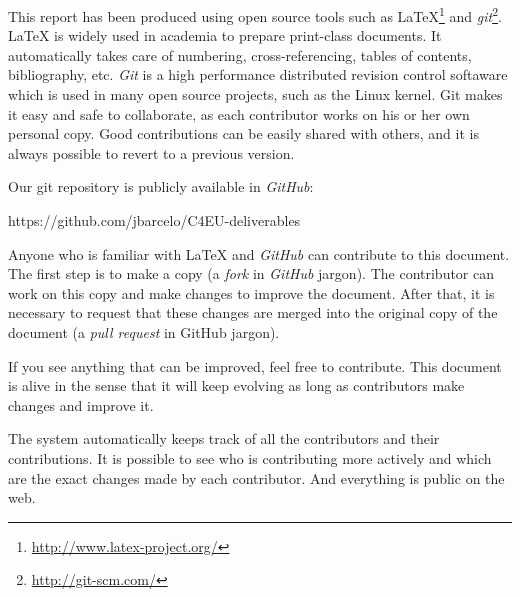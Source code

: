 This report has been produced using open source tools such as {\LaTeX}\footnote{\url{http://www.latex-project.org/}} and \emph{git}\footnote{\url{http://git-scm.com/}}.
{\LaTeX} is widely used in academia to prepare print-class documents.
It automatically takes care of numbering, cross-referencing, tables of contents, bibliography, etc.
\emph{Git} is a high performance distributed revision control softaware which is used in many open source projects, such as the Linux kernel.
Git makes it easy and safe to collaborate, as each contributor works on his or her own personal copy.
Good contributions can be easily shared with others, and it is always possible to revert to a previous version.

Our git repository is publicly available in \emph{GitHub}:

https://github.com/jbarcelo/C4EU-deliverables

Anyone who is familiar with {\LaTeX} and \emph{GitHub} can contribute to this document.
The first step is to make a copy (a \emph{fork} in \emph{GitHub} jargon).
The contributor can work on this copy and make changes to improve the document.
After that, it is necessary to request that these changes are merged into the original copy of the document (a \emph{pull request} in GitHub jargon).

If you see anything that can be improved, feel free to contribute.
This document is alive in the sense that it will keep evolving as long as contributors make changes and improve it.

The system automatically keeps track of all the contributors and their contributions. 
It is possible to see who is contributing more actively and which are the exact changes made by each contributor.
And everything is public on the web.
